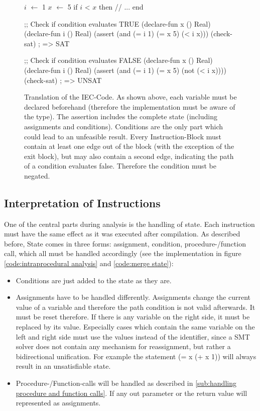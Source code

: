 \begin{figure}[h!]
	\begin{GenericCode}
		$i$ $\leftarrow$ 1
		$x$ $\leftarrow$ 5
		if $i$ < $x$ then 
			// ...
		end
	\end{GenericCode}
	\begin{GenericCode}
		;; Check if condition evaluates TRUE
		(declare-fun x () Real)
		(declare-fun i () Real)
		(assert (and (= i 1) (= x 5) (< i x)))
		(check-sat)
		; => SAT
	\end{GenericCode}
	\begin{GenericCode}
		;; Check if condition evaluates FALSE	
		(declare-fun x () Real)
		(declare-fun i () Real)
		(assert (and (= i 1) (= x 5) (not (< i x))))
		(check-sat)
		; => UNSAT
	\end{GenericCode}
	\caption{Translation of the IEC-Code. As shown above, each variable must be declared beforehand (therefore the implementation must be aware of the type). The assertion includes the complete state (including assignments and conditions). Conditions are the only part which could lead to an unfeasible result. Every Instruction-Block must contain at least one edge out of the block (with the exception of the exit block), but may also contain a second edge, indicating the path of a condition evaluates false. Therefore the condition must be negated.}
	\label{code:translation}
\end{figure}

\subsection{Interpretation of Instructions}
\label{sub:Interpretation of Instructions}
One of the central parts during analysis is the handling of state. Each instruction must have the same effect as it was executed after compilation. 
As described before, State comes in three forms: assignment, condition, procedure-/function call, which all must be handled accordingly (see the implementation in figure \ref{code:intraprocedural analysis} and \ref{code:merge state}): 

\begin{itemize}
	\item Conditions are just added to the state as they are. 
	\item Assignments have to be handled differently. Assignments change the current value of a variable and therefore the path condition is not valid afterwards. It must be reset therefore. 
		If there is any variable on the right side, it must be replaced by its value. Especially cases which contain the same variable on the left and right side must use the values instead of the identifier, since a SMT solver does not contain any mechanism for reassignment, but rather a bidirectional unification. For example the statement (= x (+ x 1)) will always result in an unsatisfiable state.
	\item Procedure-/Function-calls will be handled as described in \ref{sub:handling procedure and function calls}. If any out parameter or the return value will represented as assignments. 
\end{itemize}

